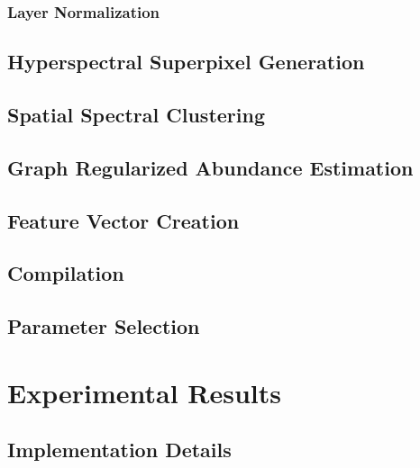\documentclass[10pt]{article}
\begin{document}
\subsubsection{Layer Normalization} \label{Normalization}


\clearpage
% 
\subsection{Hyperspectral Superpixel Generation} \label{Algorithm Superpixels}


\clearpage
\subsection{Spatial Spectral Clustering}\label{Algorithm NCuts}


\clearpage
\subsection{Graph Regularized Abundance Estimation}\label{Algorithm Unmixing}

% 
\subsection{Feature Vector Creation}\label{Algorithm FV}

\subsection{Compilation}\label{Compilation}

\subsection{Parameter Selection}\label{Parameters}


\clearpage
% 
% 
% 
% 
% 
\section{Experimental Results}


\subsection{Implementation Details}
\end{document}
